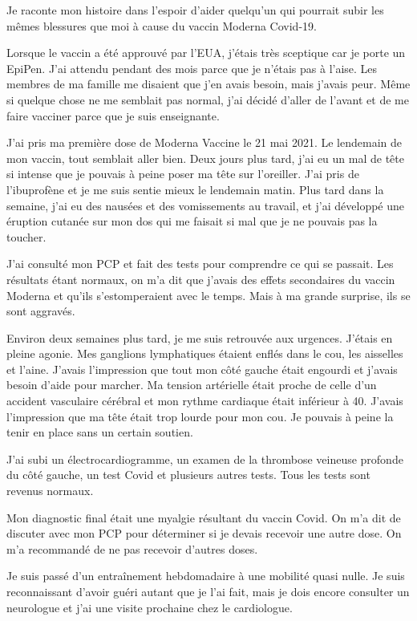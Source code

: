 Je raconte mon histoire dans l'espoir d'aider quelqu'un qui pourrait subir les
mêmes blessures que moi à cause du vaccin Moderna Covid-19.

Lorsque le vaccin a été approuvé par l'EUA, j'étais très sceptique car je porte
un EpiPen. J'ai attendu pendant des mois parce que je n'étais pas à l'aise. Les
membres de ma famille me disaient que j'en avais besoin, mais j'avais peur. Même
si quelque chose ne me semblait pas normal, j'ai décidé d'aller de l'avant et de
me faire vacciner parce que je suis enseignante.

J'ai pris ma première dose de Moderna Vaccine le 21 mai 2021. Le lendemain de
mon vaccin, tout semblait aller bien. Deux jours plus tard, j'ai eu un mal de
tête si intense que je pouvais à peine poser ma tête sur l'oreiller. J'ai pris
de l'ibuprofène et je me suis sentie mieux le lendemain matin. Plus tard dans la
semaine, j'ai eu des nausées et des vomissements au travail, et j'ai développé
une éruption cutanée sur mon dos qui me faisait si mal que je ne pouvais pas la
toucher.

J'ai consulté mon PCP et fait des tests pour comprendre ce qui se passait. Les
résultats étant normaux, on m'a dit que j'avais des effets secondaires du vaccin
Moderna et qu'ils s'estomperaient avec le temps. Mais à ma grande surprise, ils
se sont aggravés.

Environ deux semaines plus tard, je me suis retrouvée aux urgences. J'étais en
pleine agonie. Mes ganglions lymphatiques étaient enflés dans le cou, les
aisselles et l'aine. J'avais l'impression que tout mon côté gauche était
engourdi et j'avais besoin d'aide pour marcher. Ma tension artérielle était
proche de celle d'un accident vasculaire cérébral et mon rythme cardiaque était
inférieur à 40. J'avais l'impression que ma tête était trop lourde pour mon
cou. Je pouvais à peine la tenir en place sans un certain soutien.

J'ai subi un électrocardiogramme, un examen de la thrombose veineuse profonde du
côté gauche, un test Covid et plusieurs autres tests. Tous les tests sont
revenus normaux.

Mon diagnostic final était une myalgie résultant du vaccin Covid. On m'a dit de
discuter avec mon PCP pour déterminer si je devais recevoir une autre dose. On
m'a recommandé de ne pas recevoir d'autres doses.

Je suis passé d'un entraînement hebdomadaire à une mobilité quasi nulle. Je suis
reconnaissant d'avoir guéri autant que je l'ai fait, mais je dois encore
consulter un neurologue et j'ai une visite prochaine chez le cardiologue.

